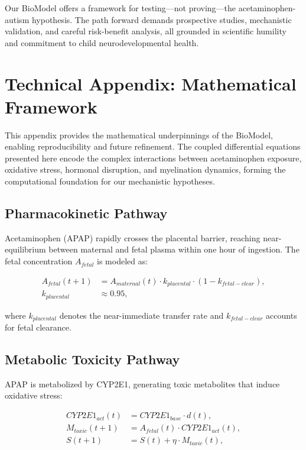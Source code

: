 \documentclass[11pt]{article}
\let\oldsection\section
\renewcommand{\section}[1]{\oldsection{#1}\setlength{\leftskip}{0em}}
\let\oldsubsection\subsection
\renewcommand{\subsection}[1]{\oldsubsection{#1}\setlength{\leftskip}{0.75em}}
\begin{document}
Our BioModel offers a framework for testing---not proving---the acetaminophen-autism hypothesis. The path forward demands prospective studies, mechanistic validation, and careful risk-benefit analysis, all grounded in scientific humility and commitment to child neurodevelopmental health.

\appendix

\clearpage
\section{Technical Appendix: Mathematical Framework}

This appendix provides the mathematical underpinnings of the BioModel, enabling reproducibility and future refinement. The coupled differential equations presented here encode the complex interactions between acetaminophen exposure, oxidative stress, hormonal disruption, and myelination dynamics, forming the computational foundation for our mechanistic hypotheses.

\subsection{Pharmacokinetic Pathway}
Acetaminophen (APAP) rapidly crosses the placental barrier, reaching near-equilibrium between maternal and fetal plasma within one hour of ingestion. The fetal concentration $A_{fetal}$ is modeled as:

\begin{align}
A_{fetal}(t+1) &= A_{maternal}(t) \cdot k_{placental} \cdot (1 - k_{fetal-clear}), \\
k_{placental} &\approx 0.95,
\end{align}

where $k_{placental}$ denotes the near-immediate transfer rate and $k_{fetal-clear}$ accounts for fetal clearance.

\subsection{Metabolic Toxicity Pathway}
APAP is metabolized by CYP2E1, generating toxic metabolites that induce oxidative stress:

\begin{align}
CYP2E1_{act}(t) &= CYP2E1_{base} \cdot d(t), \\
M_{toxic}(t+1) &= A_{fetal}(t) \cdot CYP2E1_{act}(t), \\
S(t+1) &= S(t) + \eta \cdot M_{toxic}(t),
\end{align}
\end{document}
